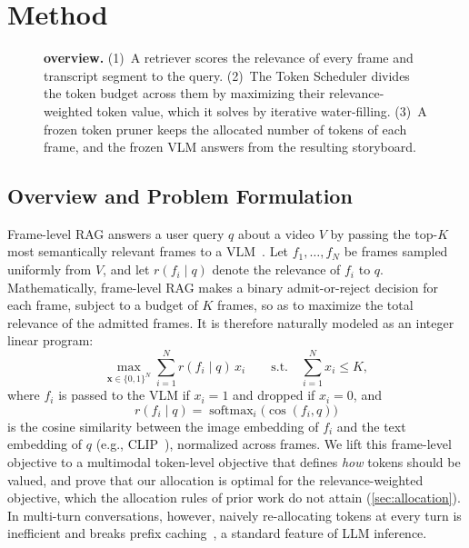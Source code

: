\section{Method}
\label{sec:method}

\begin{figure}[t]
  \centering
  \makebox[\linewidth][c]{}
  \caption{\textbf{\name overview.} (1)~A retriever scores the relevance of every frame and transcript segment to the query. (2)~The Token Scheduler divides the token budget across them by maximizing their relevance-weighted token value, which it solves by iterative water-filling. (3)~A frozen token pruner keeps the allocated number of tokens of each frame, and the frozen VLM answers from the resulting storyboard.}
  \label{fig:overview}
\end{figure}

\subsection{Overview and Problem Formulation}
\label{sec:overview}

Frame-level RAG answers a user query $q$ about a video $V$ by passing the top-$K$ most semantically relevant frames to a VLM~\cite{jeong2025videorag,tang2025aks,zhang2025qframe}. Let $f_1, \dots, f_N$ be frames sampled uniformly from $V$, and let $r(f_i\mid q)$ denote the relevance of $f_i$ to $q$. Mathematically, frame-level RAG makes a binary admit-or-reject decision for each frame, subject to a budget of $K$ frames, so as to maximize the total relevance of the admitted frames. It is therefore naturally modeled as an integer linear program:
\begin{equation}
  \max_{\mathbf{x} \in \{0,1\}^N} \sum_{i=1}^{N} r(f_i\mid q)\, x_i \qquad \text{s.t.} \quad \sum_{i=1}^{N} x_i \le K,
  \label{eq:topk}
\end{equation}
where $f_i$ is passed to the VLM if $x_i=1$ and dropped if $x_i=0$, and
\begin{equation}
  r(f_i\mid q)=\operatorname{softmax}_i\big(\cos(f_i,q)\big)
  \label{eq:rel}
\end{equation}
is the cosine similarity between the image embedding of $f_i$ and the text embedding of $q$ (e.g., CLIP~\cite{radford2021clip}), normalized across frames. We lift this frame-level objective to a multimodal token-level objective that defines \textit{how} tokens should be valued, and prove that our allocation is optimal for the relevance-weighted objective, which the allocation rules of prior work do not attain (\cref{sec:allocation}). In multi-turn conversations, however, naively re-allocating tokens at every turn is inefficient and breaks prefix caching~\cite{kwon2023vllm,zheng2024sglang}, a standard feature of LLM inference. 

